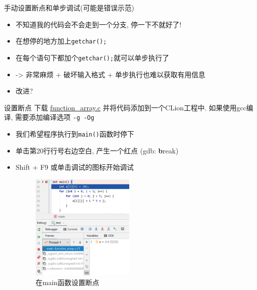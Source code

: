 \begin{frame}[fragile]{手动设置断点和单步调试(可能是错误示范)}
    \begin{itemize}[<+- | alert@+>]
        \item 不知道我的代码会不会走到一个分支, 停一下不就好了!
        \item 在想停的地方加上\texttt{getchar();}
        \item 在每个语句下都加个\texttt{getchar();}就可以单步执行了
        \item -> 非常麻烦 + 破坏输入格式 + 单步执行也难以获取有用信息
        \item 改进?
    \end{itemize}
\end{frame}

\begin{frame}[fragile]{设置断点}
    下载 \href{http://problemoverflow.top/download/function\_array.c}{function\_array.c}
    并将代码添加到一个CLion工程中.
    如果使用gcc编译, 需要添加编译选项 \texttt{-g -Og}
    \begin{itemize}[<+- | alert@+>]
        \item 我们希望程序执行到\texttt{main()}函数时停下
        \item 单击第20行行号右边空白, 产生一个红点 (gdb: \textbf{b}reak)
        \item Shift + F9 或单击调试的图标开始调试
        \begin{figure}[ht!]
            \centering
            \includegraphics[width=50mm]{figs/clion_b_main.png}
            \caption{在main函数设置断点}
        \end{figure}
    \end{itemize}
\end{frame}

